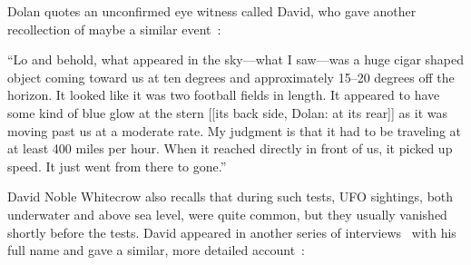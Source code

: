 Dolan quotes an unconfirmed
eye witness called David, who gave another recollection of maybe a similar event~\cite[time = 22:08 min:sec]{DolanDisclosure2020Jan}:
\begin{svgraybox}
``Lo and behold, what appeared in the sky---what I saw---was
a huge cigar shaped object coming toward us at ten degrees and approximately 15--20 degrees off the horizon.
It looked like it was two football fields in length.
It appeared to have some kind of blue glow at the stern [[its back side, Dolan:
at its rear]]
as it was moving past us at a moderate rate.
My judgment is that it had to be traveling at at least 400 miles per hour.
When it reached directly in front of us,
it picked up speed. It just went from there to gone.''
\end{svgraybox}

David Noble Whitecrow also recalls that during such tests, UFO sightings, both underwater and above sea level,
were quite common, but they usually vanished shortly before the tests.
David appeared in another series of interviews~\cite{Hein2018Dec,Hein2018Dec2} with his full name and gave a similar, more detailed account~\cite[time = 1:09:55 hour:min:sec]{Hein2018Dec}:
